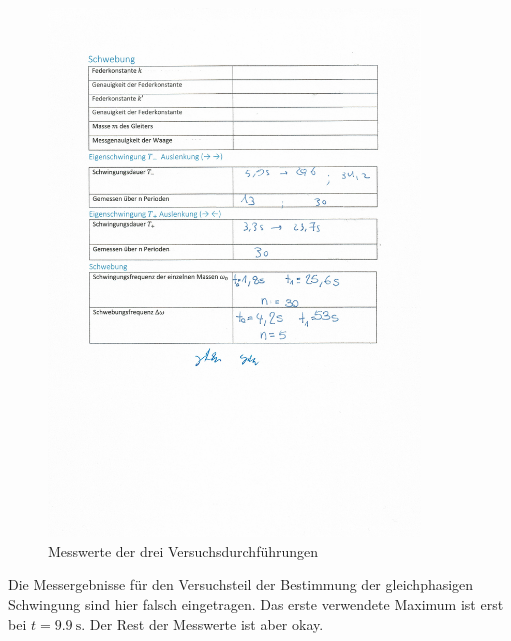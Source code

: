 \documentclass{article}
\begin{document}
              \begin{figure}[!ht]\label{fig:Messwerte2}
                  \centering
                  \includegraphics[height=14cm]{fotos/messwerte2_bild.jpg}
                  \caption{Messwerte der drei Versuchsdurchführungen}
              \end{figure}
              Die Messergebnisse für den Versuchsteil der Bestimmung der gleichphasigen Schwingung sind hier falsch eingetragen. Das erste verwendete Maximum ist erst bei \(t = \SI{9.9}{\second}\). Der Rest der Messwerte ist aber okay.
\end{document}
